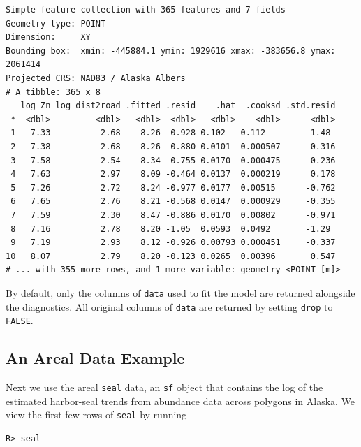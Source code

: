 \documentclass{article}
\begin{document}
\begin{verbatim}
Simple feature collection with 365 features and 7 fields
Geometry type: POINT
Dimension:     XY
Bounding box:  xmin: -445884.1 ymin: 1929616 xmax: -383656.8 ymax: 2061414
Projected CRS: NAD83 / Alaska Albers
# A tibble: 365 x 8
   log_Zn log_dist2road .fitted .resid    .hat  .cooksd .std.resid
 *  <dbl>         <dbl>   <dbl>  <dbl>   <dbl>    <dbl>      <dbl>
 1   7.33          2.68    8.26 -0.928 0.102   0.112        -1.48 
 2   7.38          2.68    8.26 -0.880 0.0101  0.000507     -0.316
 3   7.58          2.54    8.34 -0.755 0.0170  0.000475     -0.236
 4   7.63          2.97    8.09 -0.464 0.0137  0.000219      0.178
 5   7.26          2.72    8.24 -0.977 0.0177  0.00515      -0.762
 6   7.65          2.76    8.21 -0.568 0.0147  0.000929     -0.355
 7   7.59          2.30    8.47 -0.886 0.0170  0.00802      -0.971
 8   7.16          2.78    8.20 -1.05  0.0593  0.0492       -1.29 
 9   7.19          2.93    8.12 -0.926 0.00793 0.000451     -0.337
10   8.07          2.79    8.20 -0.123 0.0265  0.00396       0.547
# ... with 355 more rows, and 1 more variable: geometry <POINT [m]>
\end{verbatim}

By default, only the columns of \texttt{data} used to fit the model are
returned alongside the diagnostics. All original columns of
\texttt{data} are returned by setting \texttt{drop} to \texttt{FALSE}.

\hypertarget{an-areal-data-example}{%
\subsection{An Areal Data Example}\label{an-areal-data-example}}

Next we use the areal \texttt{seal} data, an \texttt{sf} object that
contains the log of the estimated harbor-seal trends from abundance data
across polygons in Alaska. We view the first few rows of \texttt{seal}
by running

\begin{verbatim}
R> seal
\end{verbatim}
\end{document}
